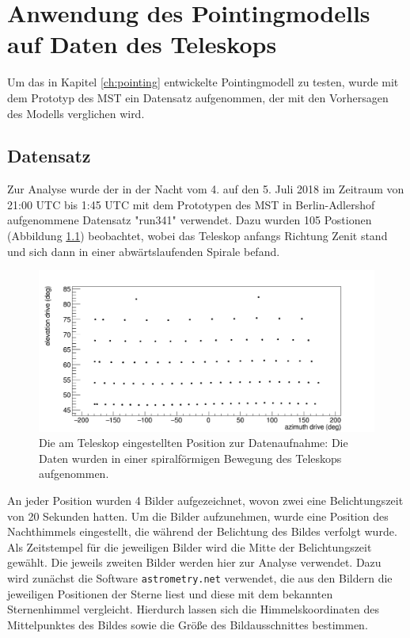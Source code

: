 \chapter{Anwendung des Pointingmodells auf Daten des Teleskops}
\label{ch:auswertung}
Um das in Kapitel \ref{ch:pointing} entwickelte Pointingmodell zu testen, wurde mit dem Prototyp des MST ein Datensatz aufgenommen, der mit den Vorhersagen des Modells verglichen wird.
\section{Datensatz}
\label{se:data}
Zur Analyse wurde der in der Nacht vom 4. auf den 5. Juli 2018 im Zeitraum von 21:00 UTC bis 1:45 UTC mit dem Prototypen des MST in Berlin-Adlershof aufgenommene Datensatz "run341" verwendet. Dazu wurden 105 Postionen (Abbildung \ref{img:record}) beobachtet, wobei das Teleskop anfangs Richtung Zenit stand und sich dann in einer abwärtslaufenden Spirale befand.
\begin{figure}[htbp]
\centering
\includegraphics[width=\textwidth]{../341/data4.png}
\caption{Die am Teleskop eingestellten Position zur Datenaufnahme: Die Daten wurden in einer spiralförmigen Bewegung des Teleskops aufgenommen.}
\label{img:record}
\end{figure}
An jeder Position wurden 4 Bilder aufgezeichnet, wovon zwei eine Belichtungszeit von 20 Sekunden hatten.
Um die Bilder aufzunehmen, wurde eine Position des Nachthimmels eingestellt, die während der Belichtung des Bildes verfolgt wurde. Als Zeitstempel für die jeweiligen Bilder wird die Mitte der Belichtungszeit gewählt. Die jeweils zweiten Bilder werden hier zur Analyse verwendet. Dazu wird zunächst die Software \texttt{astrometry.net} verwendet, die aus den Bildern die jeweiligen Positionen der Sterne liest und diese mit dem bekannten Sternenhimmel vergleicht. Hierdurch lassen sich die Himmelskoordinaten des Mittelpunktes des Bildes sowie die Größe des Bildausschnittes bestimmen.

